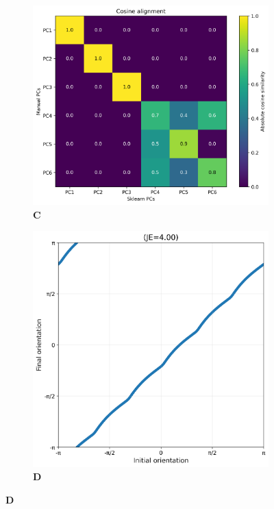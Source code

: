 \documentclass[11pt,a4paper]{article}
\begin{document}
\begin{figure}[H]
\begin{subfigure}{0.24\textwidth}
\end{subfigure}
\hfill
\begin{subfigure}{0.24\textwidth}
    \centering
    \caption*{\textbf{C}}
    \includegraphics[width=\textwidth]{cosine_alignment.png}
\end{subfigure}
\hfill
\begin{subfigure}{0.24\textwidth}
    \centering
    \caption*{\textbf{D}}
    \includegraphics[width=\textwidth]{orientation_comparison.png}
\end{subfigure}


\end{figure}
\end{document}

